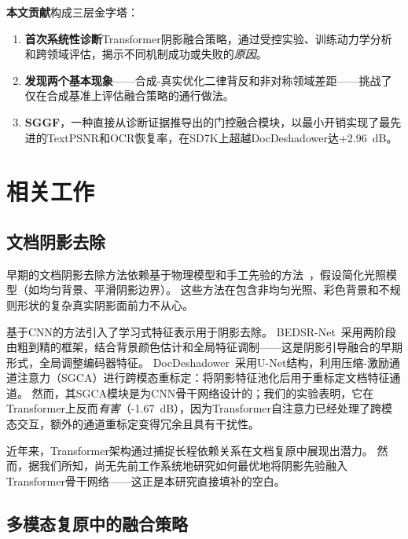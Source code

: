 \documentclass[11pt]{ctexart}
\begin{document}
\textbf{本文贡献}构成三层金字塔：

\begin{enumerate}
  \item[\textbf{C1.}] \textbf{首次系统性诊断}Transformer阴影融合策略，通过受控实验、训练动力学分析和跨领域评估，揭示不同机制成功或失败的\textit{原因}。
  \item[\textbf{C2.}] \textbf{发现两个基本现象}——合成-真实优化二律背反和非对称领域差距——挑战了仅在合成基准上评估融合策略的通行做法。
  \item[\textbf{C3.}] \textbf{SGGF}，一种直接从诊断证据推导出的门控融合模块，以最小开销实现了最先进的TextPSNR和OCR恢复率，在SD7K上超越DocDeshadower达+2.96~dB。
\end{enumerate}

\section{相关工作}

\subsection{文档阴影去除}

早期的文档阴影去除方法依赖基于物理模型和手工先验的方法~\cite{bako2016minimal,Liuspectral}，假设简化光照模型（如均匀背景、平滑阴影边界）。
这些方法在包含非均匀光照、彩色背景和不规则形状的复杂真实阴影面前力不从心。

基于CNN的方法引入了学习式特征表示用于阴影去除。
BEDSR-Net~\cite{lin2020document}采用两阶段由粗到精的框架，结合背景颜色估计和全局特征调制——这是阴影引导融合的早期形式，全局调整编码器特征。
DocDeshadower~\cite{li2023single}采用U-Net结构，利用压缩-激励通道注意力（SGCA）进行跨模态重标定：将阴影特征池化后用于重标定文档特征通道。
然而，其SGCA模块是为CNN骨干网络设计的；我们的实验表明，它在Transformer上反而\textit{有害}（-1.67~dB），因为Transformer自注意力已经处理了跨模态交互，额外的通道重标定变得冗余且具有干扰性。

近年来，Transformer架构通过捕捉长程依赖关系在文档复原中展现出潜力。
然而，据我们所知，尚无先前工作系统地研究如何最优地将阴影先验融入Transformer骨干网络——这正是本研究直接填补的空白。

\subsection{多模态复原中的融合策略}
\end{document}
